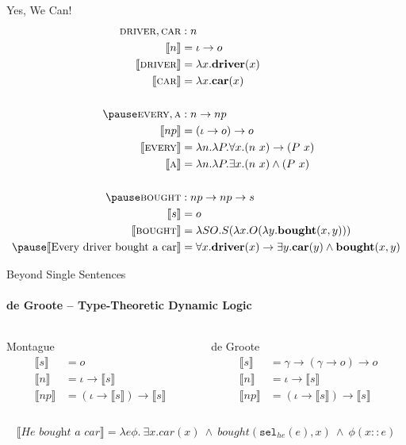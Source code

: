 \documentclass{beamer}
\newcommand{\occons}{\mathbin{::}}
\newcommand{\sem}[1]{\llbracket #1 \rrbracket}
\newcommand{\semdom}[1]{\textbf{#1}}
\begin{document}
\begin{frame}{Yes, We Can!}
\vspace{-5mm}
\begin{align*}
\textsc{driver}, \textsc{car} &: n \\
\sem{n} &= \iota \to o \\
\sem{\textsc{driver}} &= \lambda x. \semdom{driver}(x) \\
\sem{\textsc{car}} &= \lambda x. \semdom{car}(x) \\
\\ \pause
\textsc{every}, \textsc{a} &: n \to np \\
\sem{np} &= (\iota \to o) \to o \\
\sem{\textsc{every}} &= \lambda n. \lambda P. \forall x. (n\ x) \rightarrow (P\ x) \\
\sem{\textsc{a}} &= \lambda n. \lambda P. \exists x. (n\ x) \land (P\ x) \\
\\ \pause
\textsc{bought} &: np \to np \to s \\
\sem{s} &= o \\
\sem{\textsc{bought}} &= \lambda S O. S (\lambda x. O (\lambda y. \semdom{bought}(x, y))) \\
\pause
\sem{\text{Every driver bought a car}} &= \forall x. \semdom{driver}(x) \rightarrow \exists y. \semdom{car}(y) \land \semdom{bought}(x, y)
\end{align*}
\end{frame}


\begin{frame}{Beyond Single Sentences}
\framesubtitle{de Groote -- Type-Theoretic Dynamic Logic}
\begin{columns}
\begin{column}{0.5\textwidth}
  \begin{block}{Montague}
    \begin{align*}
      \sem{s} &= o \\
      \sem{n} &= \iota \to \sem{s} \\
      \sem{np} &= (\iota \to \sem{s}) \to \sem{s}
    \end{align*}
  \end{block}
\end{column}
\begin{column}{0.5\textwidth}
  \begin{block}{de Groote}
     \begin{align*}
      \sem{s} &= \gamma \to (\gamma \to o) \to o \\
      \sem{n} &= \iota \to \sem{s} \\
      \sem{np} &= (\iota \to \sem{s}) \to \sem{s}
    \end{align*}
  \end{block}
\end{column}
\end{columns}
\vfill
\pause
$$
\sem{\textit{He bought a car}} = \lambda e \phi.\ \exists
x. car(x)\ \land\ bought(\texttt{sel}_{he}(e), x)\ \land\ \phi (x \occons e)
$$
\end{frame}
\end{document}

